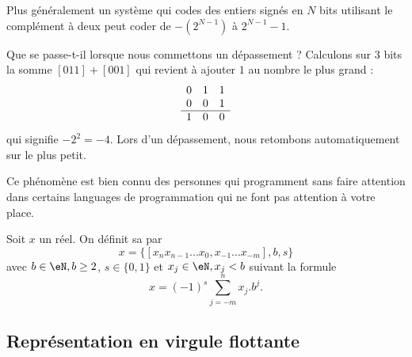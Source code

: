 Plus généralement un système qui codes des entiers signés en \( N\) bits utilisant le complément à deux peut coder de \( -(2^{N-1})\) à \( 2^{N-1}-1\).

\begin{normaltext}[Le dépassement]
    Que se passe-t-il lorsque nous commettons un dépassement ? Calculons sur \( 3\) bits la somme \( [011]+[001]\) qui revient à ajouter \( 1\) au nombre le plus grand :
    \begin{equation*}
        \begin{array}[]{ccc}
            0&1&1\\
            0&0&1\\
            \hline
            1&0&0\\
        \end{array}
    \end{equation*}
    qui signifie \( -2^2=-4\). Lors d'un dépassement, nous retombons automatiquement sur le plus petit. 
    
    Ce phénomène est bien connu des personnes qui programment sans faire attention dans certains languages de programmation qui ne font pas attention à votre place.
\end{normaltext}


\begin{definition}
	Soit $x$ un réel. On définit sa  par
	\begin{equation}
		x=\{[x_nx_{n-1}...x_0,x_{-1}...x_{-m}], b, s\}
	\end{equation}
	avec  $b\in\eN, b\geq2$, $s\in\{0,1\}$ et $x_j\in\eN,x_j<b$ suivant la formule
	\begin{equation}
		x=(-1)^{s}\sum_{j=-m}^nx_j.b^j.
	\end{equation}
\end{definition}

\subsection{Représentation en virgule flottante}

